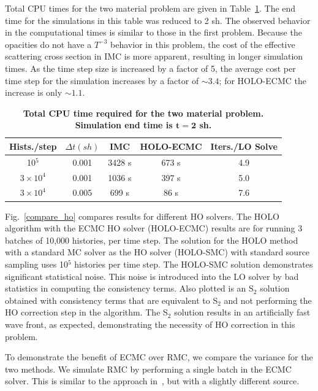 \documentclass{mc2013}
\begin{document}
Total CPU times for the two material problem are given in Table~\ref{twomat_table}. The end time for the simulations in this table was reduced to 2 sh.  The observed behavior in the computational times is similar to those
in the first problem.  Because the opacities do not have a $T^{-3}$ behavior in this problem, the cost of the effective scattering cross section in IMC is more apparent, resulting in longer simulation times.  As the time step size is increased by a factor of 5, the average cost per time step for the simulation increases by a factor of $\sim3.4$; for HOLO-ECMC the increase is only $\sim1.1$.   
\begin{table}[htb!]
\centering
\caption{\label{twomat_table} \textbf{Total CPU time required for the two material problem.  Simulation end time is $\mathbf{t=2}$ sh.}}
	\begin{tabular}{|cc|c|cc|} \hline
Hists./step & $\Delta t (sh)$ & IMC & HOLO-ECMC  &  Iters./LO Solve\\ \hline
10$^5$                    &   0.001	& 3428 s  &	673 s & 4.9 \\
$3\times10^4 $   &    0.001	& 1036 s  &	397 s  &    5.0 \\
$3\times10^4$     &   0.005	&  699 s  &  86 s  &    7.6 \\ \hline
\end{tabular}
\end{table}



Fig.~\ref{compare_ho} compares results for different HO solvers.  The HOLO algorithm
with the ECMC HO solver (HOLO-ECMC) results
are for running 3 batches of 10,000 histories, per time step. The solution for the HOLO method with a standard MC solver as the HO solver
(HOLO-SMC) with standard source sampling uses 10$^5$ histories per time step. The HOLO-SMC solution demonstrates significant
statistical noise.  This noise is introduced into the LO solver by bad statistics in
computing the consistency terms. Also
plotted is an S$_2$ solution obtained with consistency terms that are equivalent
to S$_2$ and not performing the HO correction step in the algorithm.  The S$_2$ solution results in an artificially fast
wave front, as expected, demonstrating the necessity of HO correction in this problem.

To demonstrate the benefit of ECMC over RMC, we compare the variance for the two
methods. We simulate RMC by performing a single batch in the ECMC solver.  This is
similar to the approach in~\cite{rmc}, but with a slightly different source.
\end{document}
